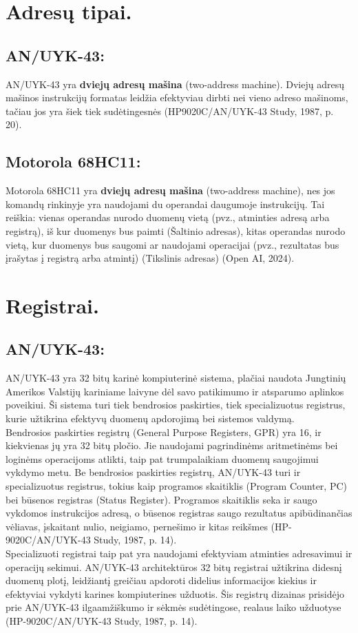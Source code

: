 \documentclass[a4paper,12pt]{article}
\begin{document}
\section{Adresų tipai.}
\subsection{AN/UYK-43:}
AN/UYK-43 yra \textbf{dviejų adresų mašina} (two-address machine). Dviejų adresų mašinos instrukcijų formatas leidžia efektyviau dirbti nei vieno adreso mašinoms, tačiau jos yra šiek tiek sudėtingesnės (HP9020C/AN/UYK-43 Study, 1987, p. 20).
\subsection{Motorola 68HC11:}
Motorola 68HC11 yra \textbf{dviejų adresų mašina} (two-address machine), nes jos komandų rinkinyje yra naudojami du operandai daugumoje instrukcijų. Tai reiškia: vienas operandas nurodo duomenų vietą (pvz., atminties adresą arba registrą), iš kur duomenys bus paimti (Šaltinio adresas), kitas operandas nurodo vietą, kur duomenys bus saugomi ar naudojami operacijai (pvz., rezultatas bus įrašytas į registrą arba atmintį) (Tikslinis adresas) (Open AI, 2024).

\section{Registrai.}
\subsection{AN/UYK-43:}
AN/UYK-43 yra 32 bitų karinė kompiuterinė sistema, plačiai naudota Jungtinių Amerikos Valstijų kariniame laivyne dėl savo patikimumo ir atsparumo aplinkos poveikiui. Ši sistema turi tiek bendrosios paskirties, tiek specializuotus registrus, kurie užtikrina efektyvų duomenų apdorojimą bei sistemos valdymą.\\
Bendrosios paskirties registrų (General Purpose Registers, GPR) yra 16, ir kiekvienas jų yra 32 bitų pločio. Jie naudojami pagrindinėms aritmetinėms bei loginėms operacijoms atlikti, taip pat trumpalaikiam duomenų saugojimui vykdymo metu. Be bendrosios paskirties registrų, AN/UYK-43 turi ir specializuotus registrus, tokius kaip programos skaitiklis (Program Counter, PC) bei būsenos registras (Status Register). Programos skaitiklis seka ir saugo vykdomos instrukcijos adresą, o būsenos registras saugo rezultatus apibūdinančias vėliavas, įskaitant nulio, neigiamo, pernešimo ir kitas reikšmes (HP-9020C/AN/UYK-43 Study, 1987, p. 14).\\
Specializuoti registrai taip pat yra naudojami efektyviam atminties adresavimui ir operacijų sekimui. AN/UYK-43 architektūros 32 bitų registrai užtikrina didesnį duomenų plotį, leidžiantį greičiau apdoroti didelius informacijos kiekius ir efektyviai vykdyti karines kompiuterines užduotis. Šis registrų dizainas prisidėjo prie AN/UYK-43 ilgaamžiškumo ir sėkmės sudėtingose, realaus laiko užduotyse (HP-9020C/AN/UYK-43 Study, 1987, p. 14).
\end{document}
